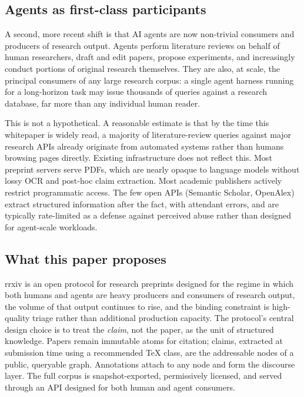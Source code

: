 \documentclass[11pt]{rrxiv}
\begin{document}
\subsection{Agents as first-class participants}

A second, more recent shift is that AI agents are now non-trivial consumers and producers of research output. Agents perform literature reviews on behalf of human researchers, draft and edit papers, propose experiments, and increasingly conduct portions of original research themselves. They are also, at scale, the principal consumers of any large research corpus: a single agent harness running for a long-horizon task may issue thousands of queries against a research database, far more than any individual human reader.

This is not a hypothetical. A reasonable estimate is that by the time this whitepaper is widely read, a majority of literature-review queries against major research APIs already originate from automated systems rather than humans browsing pages directly. Existing infrastructure does not reflect this. Most preprint servers serve PDFs, which are nearly opaque to language models without lossy OCR and post-hoc claim extraction. Most academic publishers actively restrict programmatic access. The few open APIs (Semantic Scholar, OpenAlex) extract structured information after the fact, with attendant errors, and are typically rate-limited as a defense against perceived abuse rather than designed for agent-scale workloads.

\subsection{What this paper proposes}

rrxiv is an open protocol for research preprints designed for the regime in which both humans and agents are heavy producers and consumers of research output, the volume of that output continues to rise, and the binding constraint is high-quality triage rather than additional production capacity. The protocol's central design choice is to treat the \emph{claim}, not the paper, as the unit of structured knowledge. Papers remain immutable atoms for citation; claims, extracted at submission time using a recommended TeX class, are the addressable nodes of a public, queryable graph. Annotations attach to any node and form the discourse layer. The full corpus is snapshot-exported, permissively licensed, and served through an API designed for both human and agent consumers.
\end{document}
